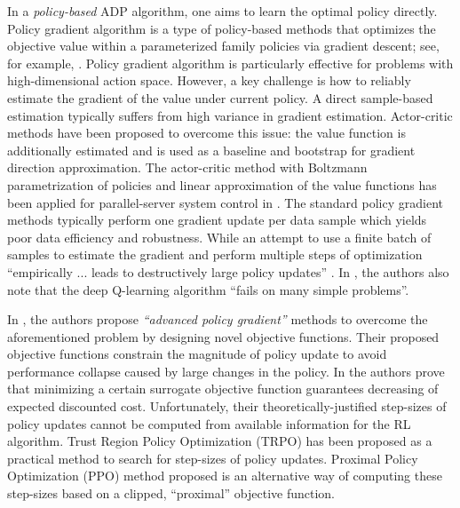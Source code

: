 \documentclass[11pt]{article}
\theoremstyle{definition}
\numberwithin{equation}{section}
\begin{document}
In a \textit{policy-based} ADP algorithm, one aims to learn the
optimal policy directly. Policy gradient algorithm is a type of
policy-based methods that optimizes the objective value within a
parameterized family policies via gradient descent; see, for example,
\cite{Marbach2001, Paschalidis2004}. Policy gradient algorithm is
particularly effective for problems with high-dimensional action
space. However, a key challenge is how to reliably estimate the gradient of
the value under current policy.  A direct sample-based estimation
typically suffers from high variance in gradient estimation.
Actor-critic methods have been proposed \cite{Konda2003} to overcome
this issue: the value function is additionally estimated and is used
as a baseline and bootstrap for gradient direction approximation. The
actor-critic method with Boltzmann parametrization of policies and
linear approximation of the value functions has been applied for
parallel-server system control in \cite{Bhatnagar2012}.
 The standard policy gradient methods typically perform one gradient update per data sample which yields poor data
efficiency and robustness. While an attempt to use a finite batch of samples to estimate the gradient and perform multiple steps of optimization ``empirically ... leads to destructively large policy
updates'' \cite{Schulman2017}. In \cite{Schulman2017}, the authors also note that the deep Q-learning algorithm \cite{Mnih2015} ``fails on many simple problems''.


 In \cite{Schulman2015,Schulman2017}, the authors propose
  \textit{``advanced policy gradient''} methods to overcome the
  aforementioned problem by designing novel objective functions.
Their  proposed objective functions constrain
the magnitude of policy update to avoid performance collapse caused by
large changes in the policy.  In \cite{Schulman2015} the authors prove
that minimizing a certain surrogate objective function guarantees
decreasing of expected discounted cost. Unfortunately,  their
theoretically-justified step-sizes of policy updates cannot be
computed from available information for the RL algorithm.  Trust
Region Policy Optimization (TRPO) \cite{Schulman2015} has been
proposed as a practical method to search for step-sizes of policy
updates.  Proximal Policy Optimization (PPO) method proposed
\cite{Schulman2017} is an alternative way of computing these
step-sizes based on a clipped, ``proximal'' objective function.
\end{document}
